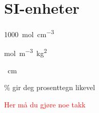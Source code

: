 \section{SI-enheter}
\SI{1000}{\mol\per\cubic\centi\meter} %

\si{\mol \per \cubic \meter\kilo\gram\squared} %

\si{\per \centi\meter}

\% gir deg prosenttegn likevel

\textcolor{red}{Her må du gjøre noe takk}